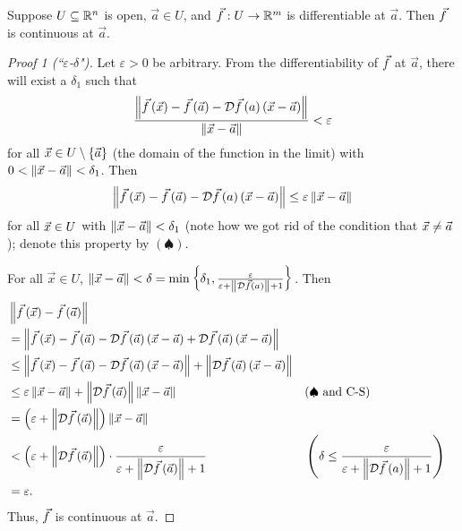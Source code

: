 \documentclass[main.tex]{subfiles}
\begin{document}
\begin{lemma}
    Suppose $U\subseteq \mathbb R^n$ is open, $\vec{a}\in U$, and $\vec{f} : U\to \mathbb R^m$ is differentiable at $\vec{a}$. Then $\vec{f}$ is continuous at $\vec{a}$.
\end{lemma}
\begin{proof}[Proof 1 (``$\varepsilon$-$\delta$")]
    Let $\varepsilon > 0$ be arbitrary. From the differentiability of $\vec{f}$ at $\vec{a}$, there will exist a $\delta_1$ such that
    \[\frac{\left\lVert \vec{f}\left( \vec{x} \right) - \vec{f}\left( \vec{a} \right) - \mathcal{D}\vec{f}\left( a \right)\left( \vec{x} - \vec{a} \right) \right\rVert}{\left\lVert \vec{x} - \vec{a} \right\rVert} < \varepsilon\]
    for all $\vec{x}\in U\setminus \left\{ \vec{a} \right\}$ (the domain of the function in the limit) with $0 < \left\lVert \vec{x} - \vec{a} \right\rVert < \delta_1$. Then
    \[\left\lVert \vec{f}\left( \vec{x} \right) - \vec{f}\left( \vec{a} \right) - \mathcal{D}\vec{f}\left( a \right)\left( \vec{x} - \vec{a} \right) \right\rVert \le \varepsilon\left\lVert \vec{x} - \vec{a} \right\rVert\]
    for all $\vec{x}\in U$ with $\left\lVert \vec{x} - \vec{a} \right\rVert < \delta_1$ (note how we got rid of the condition that $\vec{x}\neq \vec{a}$); denote this property by $(\spadesuit)$.

    For all $\vec{x}\in U$, $\left\lVert \vec{x} - \vec{a} \right\rVert < \delta = \min\left\{ \delta_1, \frac{\varepsilon}{\varepsilon + \left\lVert \mathcal{D}\vec{f}\left( a \right) \right\rVert + 1} \right\}$. Then
    \begin{align*}
        &\left\lVert \vec{f}\left( \vec{x} \right) - \vec{f}\left( \vec{a} \right) \right\rVert \\
        &= \left\lVert \vec{f}\left( \vec{x} \right) - \vec{f}\left( \vec{a} \right) - \mathcal{D}\vec{f}\left( \vec{a} \right)\left( \vec{x} - \vec{a} \right) + \mathcal{D}\vec{f}\left( \vec{a} \right)\left( \vec{x} - \vec{a} \right) \right\rVert \\
        &\le \left\lVert \vec{f}\left( \vec{x} \right) - \vec{f}\left( \vec{a} \right) - \mathcal{D}\vec{f}\left( \vec{a} \right)\left( \vec{x} - \vec{a} \right) \right\rVert + \left\lVert \mathcal{D}\vec{f}\left( \vec{a} \right)\left( \vec{x} - \vec{a} \right) \right\rVert \\
        &\le \varepsilon\left\lVert \vec{x} - \vec{a} \right\rVert + \left\lVert \mathcal{D}\vec{f}\left( \vec{a} \right) \right\rVert \left\lVert \vec{x} - \vec{a} \right\rVert && (\spadesuit\text{ and C-S}) \\
        &= \left( \varepsilon + \left\lVert \mathcal{D}\vec{f}\left( \vec{a} \right) \right\rVert \right)\left\lVert \vec{x} - \vec{a} \right\rVert \\
        &< \left( \varepsilon + \left\lVert \mathcal{D}\vec{f}\left( \vec{a} \right) \right\rVert \right)\cdot \frac{\varepsilon}{\varepsilon + \left\lVert \mathcal{D}\vec{f}\left( \vec{a} \right) \right\rVert + 1} && \left( \delta \le \frac{\varepsilon}{\varepsilon + \left\lVert \mathcal{D}\vec{f}\left( a \right) \right\rVert + 1} \right) \\
        &= \varepsilon.
    \end{align*}
    Thus, $\vec{f}$ is continuous at $\vec{a}$.
\end{proof}
\end{document}
